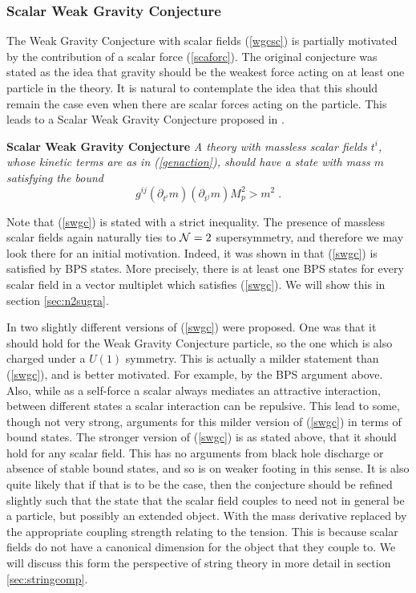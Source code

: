 \documentclass[11pt,a4paper]{article}
\numberwithin{equation}{section}
\numberwithin{table}{section}\setlength{\multlinegap}{25pt}
\newcommand{\be}{\begin{equation}}
\newcommand{\ee}{\end{equation}}
\begin{document}
\subsubsection{Scalar Weak Gravity Conjecture}
\label{sec:scalwgc}

The Weak Gravity Conjecture with scalar fields (\ref{wgcsc}) is partially motivated by the contribution of a scalar force (\ref{scaforc}). The original conjecture \cite{ArkaniHamed:2006dz} was stated as the idea that gravity should be the weakest force acting on at least one particle in the theory. It is natural to contemplate the idea that this should remain the case even when there are scalar forces acting on the particle. This leads to a Scalar Weak Gravity Conjecture proposed in \cite{Palti:2017elp}.

\begin{tcolorbox}
{\bf Scalar Weak Gravity Conjecture } \;\cite{Palti:2017elp}
{\it 
\newline
\newline
A theory with massless scalar fields $t^i$, whose kinetic terms are as in (\ref{genaction}), should have a state with mass $m$ satisfying the bound
\be
\label{swgc}
g^{ij} \left( \partial_{t^i} m \right) \left( \partial_{t^j} m \right) M_p^2 > m^2 \;.
\ee 
}
\end{tcolorbox}

Note that (\ref{swgc}) is stated with a strict inequality. The presence of massless scalar fields again naturally ties to ${\cal N}=2$ supersymmetry, and therefore we may look there for an initial motivation. Indeed, it was shown in \cite{Palti:2017elp} that (\ref{swgc}) is satisfied by BPS states. More precisely, there is at least one BPS states for every scalar field in a vector multiplet which satisfies (\ref{swgc}). We will show this in section \ref{sec:n2sugra}.

In \cite{Palti:2017elp} two slightly different versions of (\ref{swgc}) were proposed. One was that it should hold for the Weak Gravity Conjecture particle, so the one which is also charged under a $U(1)$ symmetry. This is actually a milder statement than (\ref{swgc}), and is better motivated. For example, by the BPS argument above. Also, while as a self-force a scalar always mediates an attractive interaction, between different states a scalar interaction can be repulsive. This lead to some, though not very strong, arguments for this milder version of (\ref{swgc}) in terms of bound states. The stronger version of (\ref{swgc}) is as stated above, that it should hold for any scalar field. This has no arguments from black hole discharge or absence of stable bound states, and so is on weaker footing in this sense. It is also quite likely that if that is to be the case, then the conjecture should be refined slightly such that the state that the scalar field couples to need not in general be a particle, but possibly an extended object. With the mass derivative replaced by the appropriate coupling strength relating to the tension. This is because scalar fields do not have a canonical dimension for the object that they couple to. We will discuss this form the perspective of string theory in more detail in section \ref{sec:stringcomp}.
\end{document}
